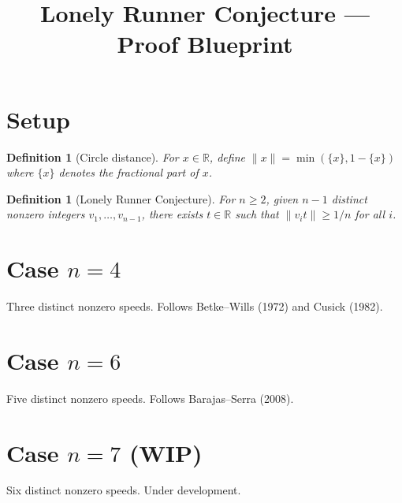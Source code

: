 \documentclass[11pt]{article}
\title{Lonely Runner Conjecture — Proof Blueprint}
\author{}
\date{}
\newtheorem{definition}[theorem]{Definition}
\begin{document}
\maketitle

\section{Setup}

\begin{definition}[Circle distance]
For $x \in \mathbb{R}$, define $\|x\| = \min(\{x\}, 1 - \{x\})$
where $\{x\}$ denotes the fractional part of $x$.
\end{definition}

\begin{definition}[Lonely Runner Conjecture]
For $n \geq 2$, given $n-1$ distinct nonzero integers $v_1, \ldots, v_{n-1}$,
there exists $t \in \mathbb{R}$ such that $\|v_i t\| \geq 1/n$ for all $i$.
\end{definition}

\section{Case $n = 4$}

Three distinct nonzero speeds. Follows Betke--Wills (1972) and Cusick (1982).

\section{Case $n = 6$}

Five distinct nonzero speeds. Follows Barajas--Serra (2008).

\section{Case $n = 7$ (WIP)}

Six distinct nonzero speeds. Under development.
\end{document}
